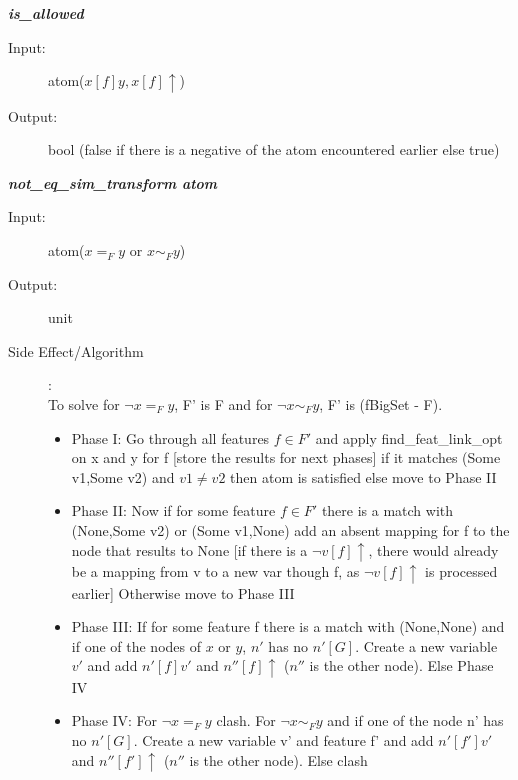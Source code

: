 \documentclass[12pt]{article}
\begin{document}
\begin{description}
\item \textbf{\textit{is\_allowed}}
\begin{description}
    \item[Input:] atom($x[f]y , x[f]\uparrow$)
    \item[Output:] bool (false if there is a negative of the atom encountered earlier else true)
\end{description}

\item \textbf{\textit{not\_eq\_sim\_transform atom}}
\begin{description}
    \item[Input:]  atom($x=_F y$ or $x\sim_F y$)
    \item[Output:] unit
    \item[Side Effect/Algorithm]:\\To solve for $\lnot x=_F y$, F' is F and for $\lnot x\sim_F y$, F' is (fBigSet - F). 
    

    \begin{itemize} %
        \item Phase I: Go through all features $f\in F'$ and apply find\_feat\_link\_opt on x and y for f [store the results for next phases] if it matches (Some v1,Some v2) and $v1\neq v2$ then atom is satisfied else move to Phase II
        \item Phase II: Now if for some feature $f\in F'$ there is a match with (None,Some v2) or (Some v1,None) add an absent mapping for f to the node that results to None [if there is a $\lnot v[f]\uparrow$, there would already be a mapping from v to a new var though f, as $\lnot v[f]\uparrow$ is processed earlier] Otherwise move to Phase III 
        \item Phase III: If for some feature f there is a match with (None,None) 
        and if one of the nodes of $x$ or $y$,
        $n'$ has no $n'[G]$. Create a new variable $v'$ and add $n'[f]v'$ and $n''[f] \uparrow$ ($n''$ is the other node). Else Phase IV
        \item Phase IV: For $\lnot x=_F y$ clash. For  $\lnot x\sim_F y$ and if one of the node n' has no $n'[G]$. Create a new variable v' and feature f' and add $n'[f']v'$ and $n''[f']\uparrow$ ($n''$ is the other node). Else clash

    \end{itemize}
\end{description}

\end{description}
\end{document}
